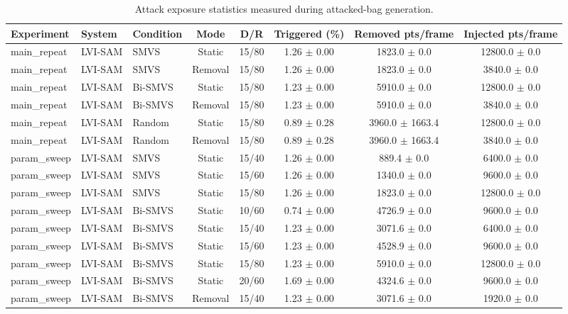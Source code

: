 \begin{table}[t]
\centering
\caption{Attack exposure statistics measured during attacked-bag generation.}
\label{tab:attack_exposure_stats}
\begin{tabular}{lllccccc}
\hline
Experiment & System & Condition & Mode & D/R & Triggered (\%) & Removed pts/frame & Injected pts/frame \\
\hline
main\_repeat & LVI-SAM & SMVS & Static & 15/80 & 1.26 $\pm$ 0.00 & 1823.0 $\pm$ 0.0 & 12800.0 $\pm$ 0.0 \\
main\_repeat & LVI-SAM & SMVS & Removal & 15/80 & 1.26 $\pm$ 0.00 & 1823.0 $\pm$ 0.0 & 3840.0 $\pm$ 0.0 \\
main\_repeat & LVI-SAM & Bi-SMVS & Static & 15/80 & 1.23 $\pm$ 0.00 & 5910.0 $\pm$ 0.0 & 12800.0 $\pm$ 0.0 \\
main\_repeat & LVI-SAM & Bi-SMVS & Removal & 15/80 & 1.23 $\pm$ 0.00 & 5910.0 $\pm$ 0.0 & 3840.0 $\pm$ 0.0 \\
main\_repeat & LVI-SAM & Random & Static & 15/80 & 0.89 $\pm$ 0.28 & 3960.0 $\pm$ 1663.4 & 12800.0 $\pm$ 0.0 \\
main\_repeat & LVI-SAM & Random & Removal & 15/80 & 0.89 $\pm$ 0.28 & 3960.0 $\pm$ 1663.4 & 3840.0 $\pm$ 0.0 \\
param\_sweep & LVI-SAM & SMVS & Static & 15/40 & 1.26 $\pm$ 0.00 & 889.4 $\pm$ 0.0 & 6400.0 $\pm$ 0.0 \\
param\_sweep & LVI-SAM & SMVS & Static & 15/60 & 1.26 $\pm$ 0.00 & 1340.0 $\pm$ 0.0 & 9600.0 $\pm$ 0.0 \\
param\_sweep & LVI-SAM & SMVS & Static & 15/80 & 1.26 $\pm$ 0.00 & 1823.0 $\pm$ 0.0 & 12800.0 $\pm$ 0.0 \\
param\_sweep & LVI-SAM & Bi-SMVS & Static & 10/60 & 0.74 $\pm$ 0.00 & 4726.9 $\pm$ 0.0 & 9600.0 $\pm$ 0.0 \\
param\_sweep & LVI-SAM & Bi-SMVS & Static & 15/40 & 1.23 $\pm$ 0.00 & 3071.6 $\pm$ 0.0 & 6400.0 $\pm$ 0.0 \\
param\_sweep & LVI-SAM & Bi-SMVS & Static & 15/60 & 1.23 $\pm$ 0.00 & 4528.9 $\pm$ 0.0 & 9600.0 $\pm$ 0.0 \\
param\_sweep & LVI-SAM & Bi-SMVS & Static & 15/80 & 1.23 $\pm$ 0.00 & 5910.0 $\pm$ 0.0 & 12800.0 $\pm$ 0.0 \\
param\_sweep & LVI-SAM & Bi-SMVS & Static & 20/60 & 1.69 $\pm$ 0.00 & 4324.6 $\pm$ 0.0 & 9600.0 $\pm$ 0.0 \\
param\_sweep & LVI-SAM & Bi-SMVS & Removal & 15/40 & 1.23 $\pm$ 0.00 & 3071.6 $\pm$ 0.0 & 1920.0 $\pm$ 0.0 \\

\end{tabular}
\end{table}
